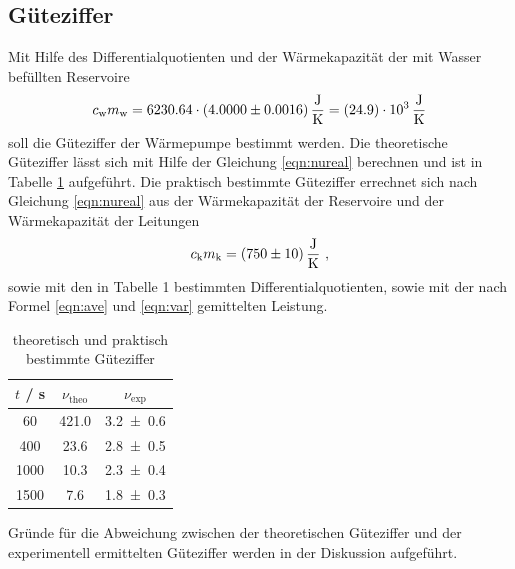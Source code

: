 \subsection{Güteziffer}
Mit Hilfe des Differentialquotienten und der Wärmekapazität der mit Wasser befüllten Reservoire
\begin{equation}
  c_\text{w} m_\text{w} = 6230.64 \cdot (\num{4 +- 0.0016}) \, \frac{\text{J}}{\text{K}} = (\num{24.9 +- 0.0}) \cdot 10^3 \, \frac{\text{J}}{\text{K}}
  \label{eqn:WC}
\end{equation}
soll die Güteziffer der Wärmepumpe bestimmt werden. Die theoretische Güteziffer lässt sich mit Hilfe der Gleichung \ref{eqn:nureal} berechnen und ist in Tabelle \ref{tab:gueteziffer} aufgeführt. Die praktisch bestimmte Güteziffer errechnet sich nach Gleichung \ref{eqn:nureal} aus der Wärmekapazität der Reservoire und der Wärmekapazität der Leitungen
\begin{equation}
  c_\text{k} m_\text{k} = (\num{750 +- 10}) \, \frac{\text{J}}{\text{K}} \ ,
  \label{eqn:Res}
\end{equation}
sowie mit den in Tabelle 1 bestimmten Differentialquotienten, sowie mit der nach Formel \ref{eqn:ave} und \ref{eqn:var} gemittelten Leistung.
\begin{table}
  \centering
  \begin{tabular}{c c c}
    \toprule
    $t$ / s & $\nu_\text{theo}$ & $\nu_\text{exp}$ \\
    \midrule
    60	 & 421.0 & \num{3.2 +- 0.6} 	\\
    400  & 23.6	 & \num{2.8 +- 0.5} 	\\
    1000 & 10.3	 & \num{2.3 +- 0.4}	\\
    1500 & 7.6	 & \num{1.8 +- 0.3} 	\\
    \bottomrule
  \end{tabular}
  \caption{theoretisch und praktisch bestimmte Güteziffer}
  \label{tab:gueteziffer}
\end{table}
Gründe für die Abweichung zwischen der theoretischen Güteziffer und der experimentell ermittelten Güteziffer werden in der Diskussion aufgeführt.
